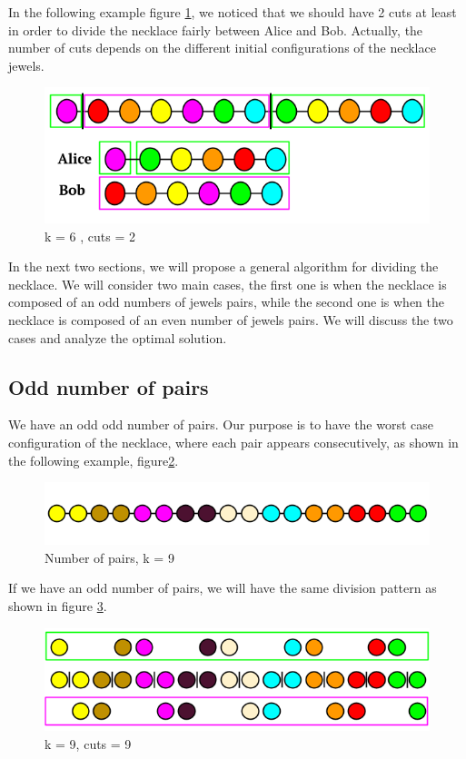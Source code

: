 \documentclass[a4paper,10pt]{article}
\begin{document}
In the following example figure \ref{16}, we noticed that we should have 2 cuts at least in order to divide the necklace fairly between Alice and Bob. Actually, the number of cuts depends on the different initial configurations of the necklace jewels.

\begin{figure}[H]
  \centering
\includegraphics[scale=.50]{_k=6 , two cut.png}
\caption{k = 6 , cuts = 2}
\label{16}
\end{figure}

In the next two sections, we will propose a general algorithm for dividing the necklace. We will consider two main cases, the first one is when the necklace is composed of an odd numbers of jewels pairs, while the second one is when the necklace is composed of an even number of jewels pairs. We will discuss the two cases and analyze the optimal solution.
\subsection{Odd number of pairs}
We have an odd odd number of pairs. Our purpose is to have the worst case configuration of the necklace, where each pair appears consecutively, as shown in the following example, figure\ref{17}.
\begin{figure}[H]
  \centering
\includegraphics[scale=.60]{k is odd (1).png}
\caption{Number of pairs, k = 9}
\label{17}
\end{figure}

If we have an odd number of pairs, we will have the same division pattern as shown in figure \ref{18}.
\begin{figure}[H]
  \centering
\includegraphics[scale=.60]{k is odd after division.png}
\caption{k = 9, cuts = 9}
\label{18}
\end{figure}
\end{document}
